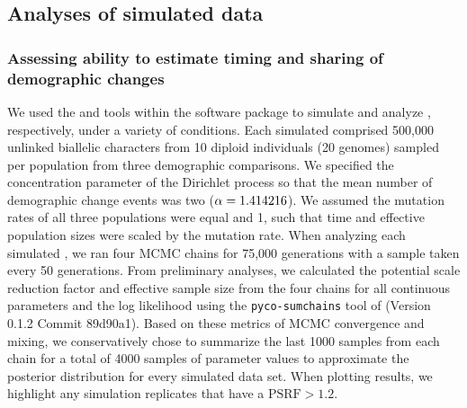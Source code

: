 
\subsection{Analyses of simulated data}

\subsubsection{Assessing ability to estimate timing and sharing of demographic changes}

We used the \simcoevolity and \ecoevolity tools within the \ecoevolity software
package
\citep{Oaks2018ecoevolity}
to simulate and analyze \datasets, respectively, under a variety of conditions.
Each simulated \dataset comprised 500,000 unlinked biallelic characters from 10
diploid individuals (20 genomes) sampled per population from three demographic
comparisons.
We specified the concentration parameter of the Dirichlet process so that the
mean number of demographic change events was two ($\alpha = 1.414216$).
We assumed the mutation rates of all three populations were equal and 1, such
that time and effective population sizes were scaled by the mutation rate.
When analyzing each simulated \dataset, we ran four MCMC chains for 75,000
generations with a sample taken every 50 generations.
From preliminary analyses, we calculated the potential scale reduction factor
\citep[PSRF; the square root of Equation 1.1 in][]{Brooks1998} and effective
sample size \citep[ESS;][]{Gong2014} from the four chains for all continuous
parameters and the log likelihood using the \texttt{pyco-sumchains} tool of
\pycoevolity (Version 0.1.2 Commit 89d90a1).
Based on these metrics of MCMC convergence and mixing, we conservatively chose
to summarize the last 1000 samples from each chain for a total of 4000 samples
of parameter values to approximate the posterior distribution for every
simulated data set.
When plotting results, we highlight any simulation replicates that have a
$\textrm{PSRF} > 1.2$.

